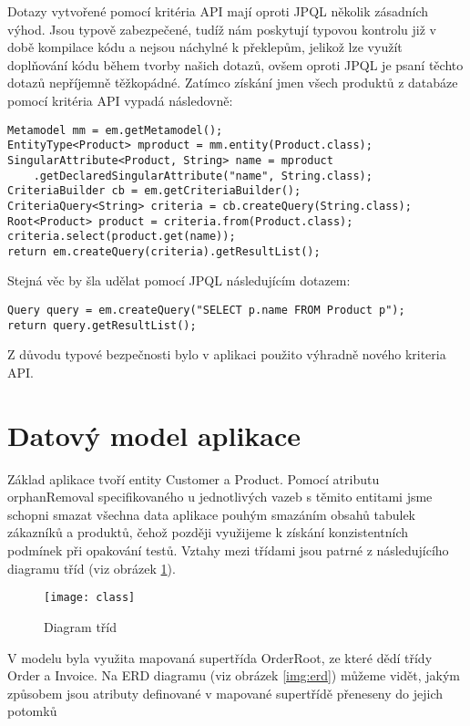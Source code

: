 \documentclass[122pt,oneside]{fithesis}
\begin{document}
Dotazy vytvořené pomocí kritéria API mají oproti JPQL několik zásadních výhod. Jsou typově zabezpečené, tudíž nám poskytují typovou kontrolu již v době kompilace kódu a nejsou náchylné k překlepům, jelikož lze využít doplňování kódu během tvorby našich dotazů, ovšem oproti JPQL je psaní těchto dotazů nepříjemně těžkopádné. Zatímco získání jmen všech produktů z databáze pomocí kritéria API vypadá následovně:

\begin{lstlisting}
Metamodel mm = em.getMetamodel();
EntityType<Product> mproduct = mm.entity(Product.class);
SingularAttribute<Product, String> name = mproduct
	.getDeclaredSingularAttribute("name", String.class);
CriteriaBuilder cb = em.getCriteriaBuilder();
CriteriaQuery<String> criteria = cb.createQuery(String.class);
Root<Product> product = criteria.from(Product.class);
criteria.select(product.get(name));
return em.createQuery(criteria).getResultList();
\end{lstlisting}

Stejná věc by šla udělat pomocí JPQL následujícím dotazem:

\begin{lstlisting}
Query query = em.createQuery("SELECT p.name FROM Product p");
return query.getResultList();
\end{lstlisting}

Z důvodu typové bezpečnosti bylo v aplikaci použito výhradně nového kriteria API.

\section{Datový model aplikace}
Základ aplikace tvoří entity Customer a Product. Pomocí atributu orphanRemoval specifikovaného u jednotlivých vazeb s těmito entitami jsme schopni smazat všechna data aplikace pouhým smazáním obsahů tabulek zákazníků a produktů, čehož později využijeme k získání konzistentních podmínek při opakování testů. Vztahy mezi třídami jsou patrné z následujícího diagramu tříd (viz obrázek \ref{img:class}).

\begin{figure}[!ht]
\centering
\texttt{[image: class]}
\caption{Diagram tříd}
\label{img:class}
\end{figure}

V modelu byla využita mapovaná supertřída OrderRoot, ze které dědí třídy Order a Invoice. Na ERD diagramu (viz obrázek \ref{img:erd}) můžeme vidět, jakým způsobem jsou atributy definované v mapované supertřídě přeneseny do jejich potomků
\end{document}

